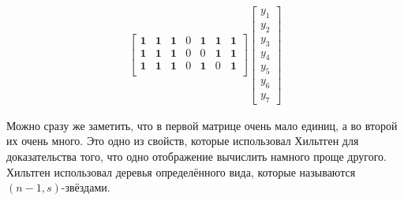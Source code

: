 \documentclass[a4paper, 14pt]{extarticle}
\begin{document}
\[\begin{aligned}
\begin{bmatrix}
\mathbf 1 & \mathbf 1 & \mathbf 1 & 0 & \mathbf 1 & \mathbf 1 & \mathbf 1 \\
\mathbf 1 & \mathbf 1 & \mathbf 1 & 0 & 0 & \mathbf 1 & \mathbf 1 \\
\mathbf 1 & \mathbf 1 & \mathbf 1 & 0 & \mathbf 1 & 0 & \mathbf 1 \\
\end{bmatrix} \begin{bmatrix}
y_1 \\ y_2 \\ y_3 \\ y_4 \\ y_5 \\ y_6 \\ y_7
\end{bmatrix}
\end{aligned}
\]

Можно сразу же заметить, что в первой матрице очень мало единиц, а во второй
их очень много. Это одно из свойств, которые использовал Хильтген для
доказательства того, что одно отображение вычислить намного проще другого.
Хильтген использовал деревья определённого вида, которые называются $(n - 1,
s)$-звёздами.
\end{document}
